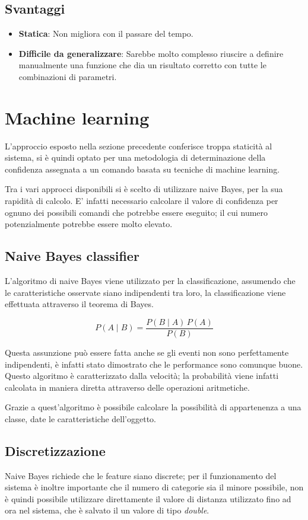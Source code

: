 \documentclass[twoside]{supsistudent}
\begin{document}
\subsection{Svantaggi}
\begin{itemize}
  \item \textbf{Statica}: Non migliora con il passare del tempo.
   \item \textbf{Difficile da generalizzare}: Sarebbe molto complesso riuscire a definire manualmente una funzione che dia un risultato corretto con tutte le combinazioni di parametri.
\end{itemize}

\section{Machine learning}
L'approccio esposto nella sezione precedente conferisce troppa staticità al sistema, si è quindi optato per una metodologia di determinazione della confidenza assegnata a un comando basata su tecniche di machine learning.

Tra i vari approcci disponibili si è scelto di utilizzare naive Bayes, per la sua rapidità di calcolo. E' infatti necessario calcolare il valore di confidenza per ognuno dei possibili comandi che potrebbe essere eseguito; il cui numero potenzialmente potrebbe essere molto elevato.
\subsection{Naive Bayes classifier}
L'algoritmo di naive Bayes viene utilizzato per la classificazione, assumendo che le caratteristiche osservate siano indipendenti tra loro, la classificazione viene effettuata attraverso il teorema di Bayes.

$$ P(A \mid B) = \frac{P(B \mid A) \, P(A)}{P(B)} $$

Questa assunzione può essere fatta anche se gli eventi non sono perfettamente indipendenti, è infatti stato dimostrato che le performance sono comunque buone. Questo algoritmo è caratterizzato dalla velocità; la probabilità viene infatti calcolata in maniera diretta attraverso delle operazioni aritmetiche.

Grazie a quest'algoritmo è possibile calcolare la possibilità di appartenenza a una classe, date le caratteristiche dell'oggetto.

\subsection{Discretizzazione}
Naive Bayes richiede che le feature siano discrete; per il funzionamento del sistema è inoltre importante che il numero di categorie sia il minore possibile, non è quindi possibile utilizzare direttamente il valore di distanza utilizzato fino ad ora nel sistema, che è salvato il un valore di tipo \textit{double}.
\end{document}

